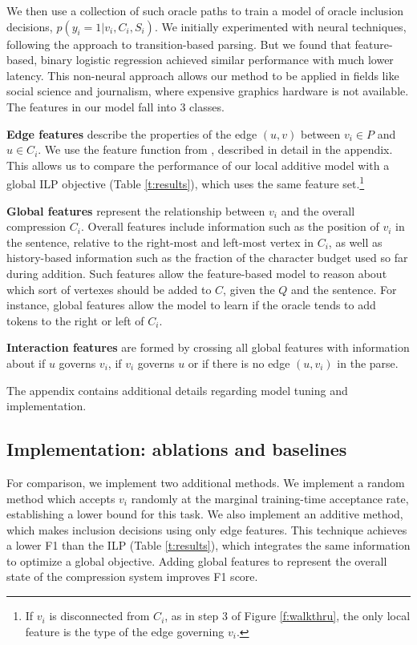\documentclass[11pt,a4paper]{article}
\begin{document}
We then use a collection of such oracle paths to train a model of oracle inclusion decisions, ${p(y_i  = 1 | v_i, C_i, S_i)}$. We initially experimented with neural techniques, following the \citet{D14-1082} approach to transition-based parsing. But we found that feature-based, binary logistic regression achieved similar performance with much lower latency. This non-neural approach allows our method to be applied in fields like social science and journalism, where expensive graphics hardware is not available. The features in our model fall into 3 classes.

\textbf{Edge features} describe the properties of the edge $(u,v)$ between $v_i \in P$ and $u \in C_i$. We use the feature function from \citet{filippova2013overcoming}, described in detail in the appendix. This allows us to compare the performance of our local additive model with a global ILP objective (Table \ref{t:results}), which uses the same feature set.\footnote{If $v_i$ is disconnected from $C_i$, as in step 3 of Figure \ref{f:walkthru}, the only local feature is the type of the edge governing $v_i$.}

\textbf{Global features} represent the relationship between $v_i$ and the overall compression $C_i$. Overall features include information such as the position of $v_i$ in the sentence, relative to the right-most and left-most vertex in $C_i$, as well as history-based information such as the fraction of the character budget used so far during addition. Such features allow the feature-based model to reason about which sort of vertexes should be added to $C$, given the $Q$ and the sentence. For instance, global features allow the model to learn if the oracle tends to add tokens to the right or left of $C_i$.

\textbf{Interaction features} are formed by crossing all global features with information about if $u$ governs $v_i$, if $v_i$ governs $u$ or if there is no edge $(u,v_i)$ in the parse.

The appendix contains additional details regarding model tuning and implementation. 

\subsection{Implementation: ablations and baselines}
For comparison, we implement two additional methods. We implement a random method which accepts $v_i$ randomly at the marginal training-time acceptance rate, establishing a lower bound for this task. We also implement an additive method, which makes inclusion decisions using only edge features. This technique achieves a lower F1 than the ILP (Table \ref{t:results}), which integrates the same information to optimize a global objective.
Adding global features to represent the overall state of the compression system improves F1 score. 
\end{document}
